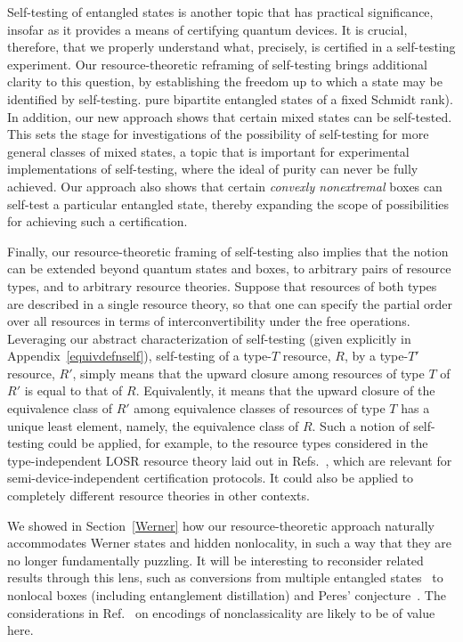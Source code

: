 \documentclass[12pt]{article}
\theoremstyle{plain}
\theoremstyle{definition}
\begin{document}
Self-testing of entangled states is another topic that has practical significance, insofar as it provides a 
  means of certifying quantum devices. It is crucial, therefore, that we properly understand 
 what, precisely, is certified in a self-testing experiment.
Our resource-theoretic reframing of self-testing brings additional clarity to this
 question, by establishing the freedom up to which a state may be identified by self-testing.
pure bipartite entangled states of a fixed Schmidt rank).
In addition, our new approach shows that certain mixed states can be self-tested.
This sets the stage for investigations of the possibility of self-testing for more general classes of mixed states, a topic that is important for experimental implementations of self-testing, where the ideal of purity can never be fully achieved.
Our approach also shows that certain {\em convexly nonextremal} boxes can self-test a particular entangled state, thereby expanding the scope of possibilities for achieving such a certification.


Finally, our resource-theoretic framing of self-testing also implies that the notion can be extended beyond quantum states and boxes, to arbitrary pairs of resource types,
 and to arbitrary resource theories. Suppose that resources of both types are described in a single resource theory, so that one can specify the partial order over all resources in terms of interconvertibility under the free operations.
Leveraging our abstract characterization of self-testing (given explicitly in Appendix~\ref{equivdefnself}), 
self-testing of a type-$T$ resource, $R$, by a type-$T'$ resource, $R'$, simply means that the upward closure among resources of type $T$ of $R'$  is equal to that of $R$. Equivalently, it means that the upward closure of the equivalence class of $R'$ among equivalence classes of resources of type $T$ has a unique least element, 
 namely, the equivalence class of $R$.
Such a notion of self-testing could be applied, for example, to the resource types
  considered in the type-independent LOSR resource theory laid out in Refs.~\cite{semiquantum,rosset2020characterizing}, which are relevant for semi-device-independent certification protocols. It could also be applied to completely different resource theories in other contexts. 
 
We showed in Section~\ref{Werner} how our resource-theoretic approach naturally accommodates Werner states and hidden nonlocality, in such a way that they are no longer fundamentally puzzling.
It will be interesting to reconsider related results through this lens, such as conversions from multiple entangled states~\cite{BBP+96,Navascues2011,Palazuelos2012} to nonlocal boxes (including entanglement distillation) and Peres' conjecture~\cite{Peres1999,Vertesi2014}. The considerations in Ref.~\cite{semiquantum} on encodings of nonclassicality are likely to be of value here.
 
\end{document}
